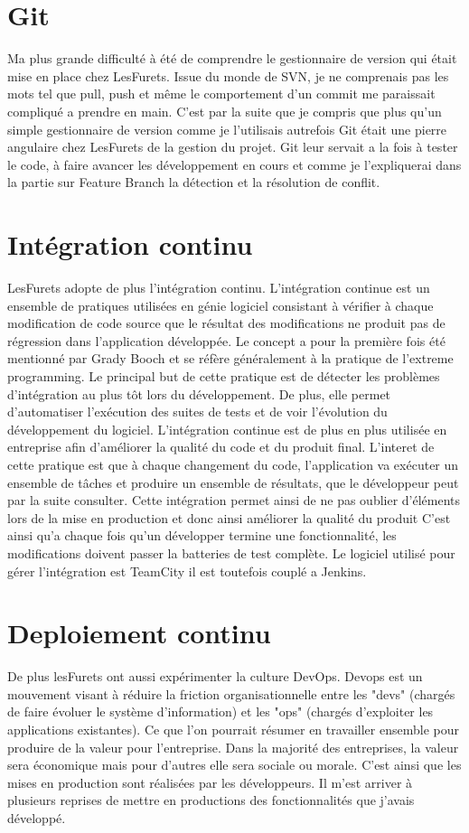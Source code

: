 \section{Git}
Ma plus grande difficulté à été de comprendre le gestionnaire de version qui était mise en place chez LesFurets. Issue du monde de SVN, je ne comprenais pas les mots tel que pull, push et même le comportement d'un commit me paraissait compliqué a prendre en main. C'est par la suite que je compris que plus qu'un simple gestionnaire de version comme je l'utilisais autrefois Git était une pierre angulaire chez LesFurets de la gestion du projet. Git leur servait a la fois à tester le code, à faire avancer les développement en cours et comme je l'expliquerai dans la partie sur Feature Branch la détection et la résolution de conflit.

\section{Intégration continu}
LesFurets adopte de plus l'intégration continu. L'intégration continue est un ensemble de pratiques utilisées en génie logiciel consistant à vérifier à chaque modification de code source que le résultat des modifications ne produit pas de régression dans l'application développée. Le concept a pour la première fois été mentionné par Grady Booch et se réfère généralement à la pratique de l'extreme programming. Le principal but de cette pratique est de détecter les problèmes d'intégration au plus tôt lors du développement. De plus, elle permet d'automatiser l'exécution des suites de tests et de voir l'évolution du développement du logiciel.
L'intégration continue est de plus en plus utilisée en entreprise afin d'améliorer la qualité du code et du produit final. L'interet de cette pratique est que à chaque changement du code, l'application va exécuter un ensemble de tâches et produire un ensemble de résultats, que le développeur peut par la suite consulter. Cette intégration permet ainsi de ne pas oublier d'éléments lors de la mise en production et donc ainsi améliorer la qualité du produit
C'est ainsi qu'a chaque fois qu'un développer termine une fonctionnalité, les modifications doivent passer la batteries de test complète. Le logiciel utilisé pour gérer l'intégration est TeamCity il est toutefois couplé a Jenkins.

\section{Deploiement continu}
De plus lesFurets ont aussi expérimenter la culture DevOps. Devops est un mouvement visant à réduire la friction organisationnelle entre les "devs" (chargés de faire évoluer le système d'information) et les "ops" (chargés d'exploiter les applications existantes).
Ce que l'on pourrait résumer en travailler ensemble pour produire de la valeur pour l'entreprise. Dans la majorité des entreprises, la valeur sera économique mais pour d'autres elle sera sociale ou morale. C'est ainsi que les mises en production sont réalisées par les développeurs. Il m'est arriver à plusieurs reprises de mettre en productions des fonctionnalités que j'avais développé.

